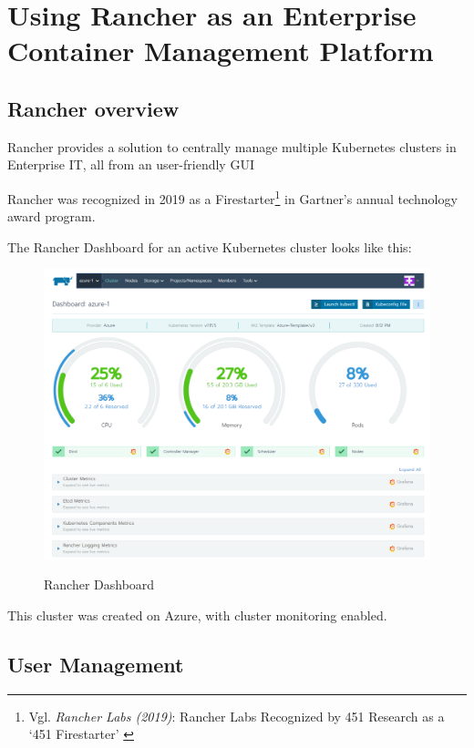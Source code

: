 %
%

\pagebreak
\section{Using Rancher as an Enterprise Container Management Platform}

\onehalfspacing

\subsection{Rancher overview}

Rancher provides a solution to centrally manage multiple Kubernetes clusters in Enterprise IT, all from an user-friendly GUI

Rancher was recognized in 2019 as a Firestarter\footnote{Vgl. \textit{Rancher Labs (2019)}: Rancher Labs Recognized by 451 Research as a ‘451 Firestarter’ \cite{firestarter451}} in Gartner's annual technology award program.

The Rancher Dashboard for an active Kubernetes cluster looks like this:

\begin{figure}[h]
\centering
\caption {Rancher Dashboard}
\includegraphics[width=\linewidth]{images/dashboard}
\label{fig:rancherDashboard}
\end{figure}

This cluster was created on Azure, with cluster monitoring enabled.

\subsection{User Management}

